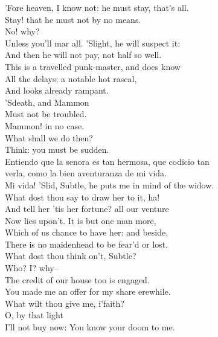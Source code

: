 \documentclass{memoir}
\begin{document}
\begin{drama*}
 'Fore heaven, I know not: he must stay, that's all.\\
\facespeaks  Stay! that he must not by no means.\\
\subtlespeaks {} No! why?\\
\facespeaks  Unless you'll mar all. 'Slight, he will suspect it:\\
 And then he will not pay, not half so well.\\
 This is a travelled punk-master, and does know\\
 All the delays; a notable hot rascal,\\
 And looks already rampant.\\
\subtlespeaks {} 'Sdeath, and Mammon\\
 Must not be troubled.\\
\facespeaks {} Mammon! in no case.\\
\subtlespeaks  What shall we do then?\\
\facespeaks {} Think: you must be sudden.\\
\surlyspeaks  Entiendo que la senora es tan hermosa, que codicio tan\\
 verla, como la bien aventuranza de mi vida.\\
\facespeaks  Mi vida! 'Slid, Subtle, he puts me in mind of the widow.\\
 What dost thou say to draw her to it, ha!\\
 And tell her 'tis her fortune? all our venture\\
 Now lies upon't. It is but one man more,\\
 Which of us chance to have her: and beside,\\
 There is no maidenhead to be fear'd or lost.\\
 What dost thou think on't, Subtle?\\
\subtlespeaks {} Who? I? why--\\
\facespeaks  The credit of our house too is engaged.\\
\subtlespeaks  You made me an offer for my share erewhile.\\
 What wilt thou give me, i'faith?\\
\facespeaks {} O, by that light\\
 I'll not buy now: You know your doom to me.\\

\end{drama*}
\end{document}
